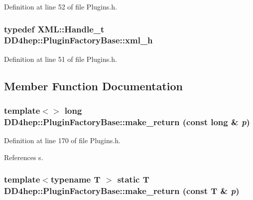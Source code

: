 Definition at line 52 of file Plugins.h.\hypertarget{struct_d_d4hep_1_1_plugin_factory_base_aedebe6835e2705756763812545bcb8fd}{
\subsubsection[{xml\_\-h}]{\setlength{\rightskip}{0pt plus 5cm}typedef {\bf XML::Handle\_\-t} {\bf DD4hep::PluginFactoryBase::xml\_\-h}}}
\label{struct_d_d4hep_1_1_plugin_factory_base_aedebe6835e2705756763812545bcb8fd}


Definition at line 51 of file Plugins.h.

\subsection{Member Function Documentation}
\hypertarget{struct_d_d4hep_1_1_plugin_factory_base_a75390f6289dd15b8dee266cd6ae542d5}{
\subsubsection[{make\_\-return}]{\setlength{\rightskip}{0pt plus 5cm}template$<$$>$ long DD4hep::PluginFactoryBase::make\_\-return (const long \& {\em p})}}
\label{struct_d_d4hep_1_1_plugin_factory_base_a75390f6289dd15b8dee266cd6ae542d5}


Definition at line 170 of file Plugins.h.

References s.\hypertarget{struct_d_d4hep_1_1_plugin_factory_base_aa44571c9839b48465479b00174edff61}{
\subsubsection[{make\_\-return}]{\setlength{\rightskip}{0pt plus 5cm}template$<$typename T $>$ static {\bf T} DD4hep::PluginFactoryBase::make\_\-return (const {\bf T} \& {\em p})}}
\label{struct_d_d4hep_1_1_plugin_factory_base_aa44571c9839b48465479b00174edff61}


